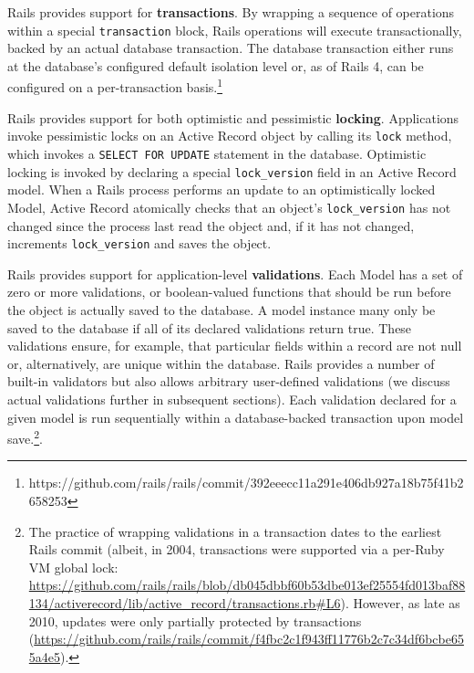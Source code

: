 \begin{myenumerate}
\item Rails provides support for \textbf{transactions}. By wrapping a
sequence of operations within a special \texttt{transaction} block,
Rails operations will execute transactionally, backed by an actual
database transaction. The database transaction either runs at the
database's configured default isolation level or, as of Rails 4, can
be configured on a per-transaction
basis.\footnote{https://github.com/rails/rails/commit/392eeecc11a291e406db927a18b75f41b2658253}

\item Rails provides support for both optimistic and pessimistic
\textbf{locking}. Applications invoke pessimistic locks on an Active
Record object by calling its \texttt{lock} method, which invokes a
\texttt{SELECT FOR UPDATE} statement in the database. Optimistic
locking is invoked by declaring a special \texttt{lock\_version} field
in an Active Record model. When a Rails process performs an update to
an optimistically locked Model, Active Record atomically checks that an object's
\texttt{lock\_version} has not changed since the process last read the
object and, if it has not changed, increments \texttt{lock\_version}
and saves the object.

\item Rails provides support for application-level
  \textbf{validations}. Each Model has a set of zero or more
  validations, or boolean-valued functions that should be run before
  the object is actually saved to the database. A model instance many
  only be saved to the database if all of its declared validations
  return true. These validations ensure, for example, that particular
  fields within a record are not null or, alternatively, are unique
  within the database. Rails provides a number of built-in validators
  but also allows arbitrary user-defined validations (we discuss
  actual validations further in subsequent sections). Each validation
  declared for a given model is run sequentially within a
  database-backed transaction upon model save.\footnote{The practice
    of wrapping validations in a transaction dates to the earliest
    Rails commit (albeit, in 2004, transactions were supported via a
    per-Ruby VM global lock:
    \url{https://github.com/rails/rails/blob/db045dbbf60b53dbe013ef25554fd013baf88134/activerecord/lib/active_record/transactions.rb#L6}). However,
    as late as 2010, updates were only partially protected by
    transactions
    (\url{https://github.com/rails/rails/commit/f4fbc2c1f943ff11776b2c7c34df6bcbe655a4e5}).}.\\[-2mm]


\end{myenumerate}
